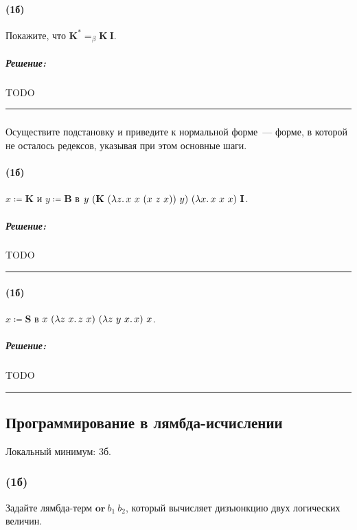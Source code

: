 \documentclass{article}
\newenvironment{proof}{\subparagraph{\hspace{-1em}Решение:\newline}}{\par\noindent\rule{\textwidth}{0.4pt}}
\newcommand{\comb}[1]{\mathbf{#1}}
\newcommand{\termdef}{\coloneqq}
\newcommand{\eqbeta}{=_\beta}
\begin{document}
    \paragraph{(1б)}

    Покажите, что $\comb{K}^* \eqbeta \comb{K}~\comb{I}$.

    \begin{proof}
        TODO %
    \end{proof}

    \subsubsection{}

    Осуществите подстановку и приведите к нормальной форме~--- форме, в которой не осталось редексов, указывая при этом основные шаги.

    \paragraph{(1б)}

    $x \termdef \comb{K}$ и $y \termdef \comb{B}$ в $y~(\comb{K}~(\lambda z\ldotp x~x~(x~z~x))~y)~(\lambda x\ldotp x~x~x)~\comb{I}$.

    \begin{proof}
        TODO %
    \end{proof}

    \paragraph{(1б)}

    $x \termdef \comb{S}$ в $x~(\lambda z~x\ldotp z~x)~(\lambda z~y~x\ldotp x)~x$.

    \begin{proof}
        TODO %
    \end{proof}

    \subsection{Программирование в лямбда-исчислении}

    Локальный минимум: 3б.

    \subsubsection{(1б)}

    Задайте лямбда-терм $\textbf{or}~b_1~b_2$, который вычисляет дизъюнкцию двух логических величин.
\end{document}
